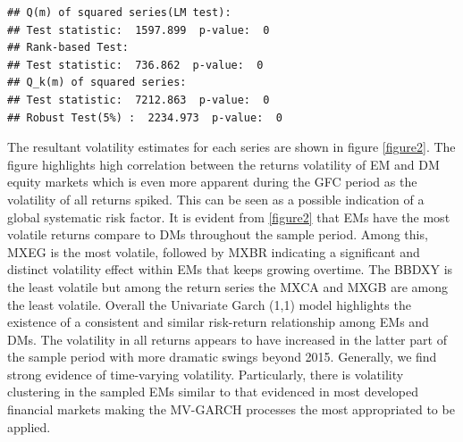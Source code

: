 \documentclass[11pt,preprint, authoryear]{elsarticle}
\numberwithin{equation}{section}
\numberwithin{figure}{section}
\numberwithin{table}{section}
\begin{document}
\begin{verbatim}
## Q(m) of squared series(LM test):  
## Test statistic:  1597.899  p-value:  0 
## Rank-based Test:  
## Test statistic:  736.862  p-value:  0 
## Q_k(m) of squared series:  
## Test statistic:  7212.863  p-value:  0 
## Robust Test(5%) :  2234.973  p-value:  0
\end{verbatim}

The resultant volatility estimates for each series are shown in figure
\ref{figure2}. The figure highlights high correlation between the
returns volatility of EM and DM equity markets which is even more
apparent during the GFC period as the volatility of all returns spiked.
This can be seen as a possible indication of a global systematic risk
factor. It is evident from \ref{figure2} that EMs have the most volatile
returns compare to DMs throughout the sample period. Among this, MXEG is
the most volatile, followed by MXBR indicating a significant and
distinct volatility effect within EMs that keeps growing overtime. The
BBDXY is the least volatile but among the return series the MXCA and
MXGB are among the least volatile. Overall the Univariate Garch (1,1)
model highlights the existence of a consistent and similar risk-return
relationship among EMs and DMs. The volatility in all returns appears to
have increased in the latter part of the sample period with more
dramatic swings beyond 2015. Generally, we find strong evidence of
time-varying volatility. Particularly, there is volatility clustering in
the sampled EMs similar to that evidenced in most developed financial
markets making the MV-GARCH processes the most appropriated to be
applied.
\end{document}
